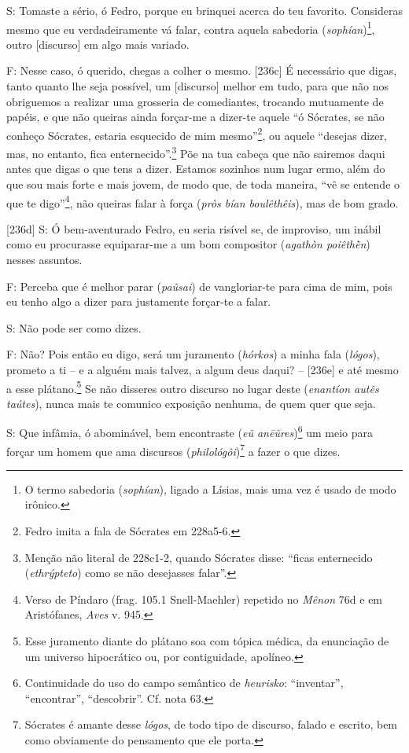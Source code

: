 S: Tomaste a sério, ó Fedro, porque eu brinquei acerca do teu favorito.
Consideras mesmo que eu verdadeiramente vá falar, contra aquela
sabedoria (\emph{sophían})\footnote{O termo sabedoria (\emph{sophían}),
  ligado a Lísias, mais uma vez é usado de modo irônico.}, outro
{[}discurso{]} em algo mais variado.

F: Nesse caso, ó querido, chegas a colher o mesmo. {[}236c{]} É
necessário que digas, tanto quanto lhe seja possível, um {[}discurso{]}
melhor em tudo, para que não nos obriguemos a realizar uma grosseria de
comediantes, trocando mutuamente de papéis, e que não queiras ainda
forçar-me a dizer-te aquele ``ó Sócrates, se não conheço Sócrates,
estaria esquecido de mim mesmo''\footnote{Fedro imita a fala de Sócrates
  em 228a5-6.}, ou aquele ``desejas dizer, mas, no entanto, fica
enternecido''.\footnote{Menção não literal de 228c1-2, quando Sócrates
  disse: ``ficas enternecido (\emph{ethrýpteto}) como se não desejasses
  falar''.} Põe na tua cabeça que não sairemos daqui antes que digas o
que tens a dizer. Estamos sozinhos num lugar ermo, além do que sou mais
forte e mais jovem, de modo que, de toda maneira, ``vê se entende o que
te digo''\footnote{Verso de Píndaro (frag. 105.1 Snell-Maehler) repetido
  no \emph{Mênon} 76d e em Aristófanes, \emph{Aves} v. 945.}, não
queiras falar à força (\emph{pròs bían boulêthêis}), mas de bom grado.

{[}236d{]} S: Ó bem-aventurado Fedro, eu seria risível se, de improviso,
um inábil como eu procurasse equiparar-me a um bom compositor
(\emph{agathòn poiêthḕn}) nesses assuntos.

F: Perceba que é melhor parar (\emph{paûsai}) de vangloriar-te para cima
de mim, pois eu tenho algo a dizer para justamente forçar-te a falar.

S: Não pode ser como dizes.

F: Não? Pois então eu digo, será um juramento (\emph{hórkos}) a minha
fala (\emph{lógos}), prometo a ti -- e a alguém mais talvez, a algum
deus daqui? -- {[}236e{]} e até mesmo a esse plátano.\footnote{Esse
  juramento diante do plátano soa com tópica médica, da enunciação de um
  universo hipocrático ou, por contiguidade, apolíneo.} Se não disseres
outro discurso no lugar deste (\emph{enantíon autês taútes}), nunca mais
te comunico exposição nenhuma, de quem quer que seja.

S: Que infâmia, ó abominável, bem encontraste (\emph{eũ
anēũres})\footnote{Continuidade do uso do campo semântico de
  \emph{heurisko}: ``inventar'', ``encontrar'', ``descobrir''. Cf. nota
  63.} um meio para forçar um homem que ama discursos
(\emph{philológôi})\footnote{Sócrates é amante desse \emph{lógos}, de
  todo tipo de discurso, falado e escrito, bem como obviamente do
  pensamento que ele porta.} a fazer o que dizes.


